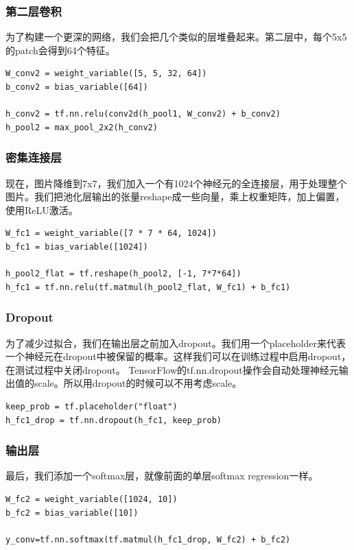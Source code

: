 \documentclass[a4paper,11pt,twoside]{ctexbook}
\begin{document}
\subsubsection{第二层卷积}

为了构建一个更深的网络，我们会把几个类似的层堆叠起来。第二层中，每个5x5的patch会得到64个特征。

\begin{lstlisting}
W_conv2 = weight_variable([5, 5, 32, 64])
b_conv2 = bias_variable([64])

h_conv2 = tf.nn.relu(conv2d(h_pool1, W_conv2) + b_conv2)
h_pool2 = max_pool_2x2(h_conv2)
\end{lstlisting}

\subsubsection{密集连接层}

现在，图片降维到7x7，我们加入一个有1024个神经元的全连接层，用于处理整个图片。我们把池化层输出的张量reshape成一些向量，乘上权重矩阵，加上偏置，使用ReLU激活。

\begin{lstlisting}
W_fc1 = weight_variable([7 * 7 * 64, 1024])
b_fc1 = bias_variable([1024])

h_pool2_flat = tf.reshape(h_pool2, [-1, 7*7*64])
h_fc1 = tf.nn.relu(tf.matmul(h_pool2_flat, W_fc1) + b_fc1)
\end{lstlisting}

\subsubsection{Dropout}
为了减少过拟合，我们在输出层之前加入dropout。我们用一个placeholder来代表一个神经元在dropout中被保留的概率。这样我们可以在训练过程中启用dropout，在测试过程中关闭dropout。 TensorFlow的tf.nn.dropout操作会自动处理神经元输出值的scale。所以用dropout的时候可以不用考虑scale。

\begin{lstlisting}
keep_prob = tf.placeholder("float")
h_fc1_drop = tf.nn.dropout(h_fc1, keep_prob)
\end{lstlisting}

\subsubsection{输出层}

最后，我们添加一个softmax层，就像前面的单层softmax regression一样。

\begin{lstlisting}
W_fc2 = weight_variable([1024, 10])
b_fc2 = bias_variable([10])

y_conv=tf.nn.softmax(tf.matmul(h_fc1_drop, W_fc2) + b_fc2)
\end{lstlisting}
\end{document}
